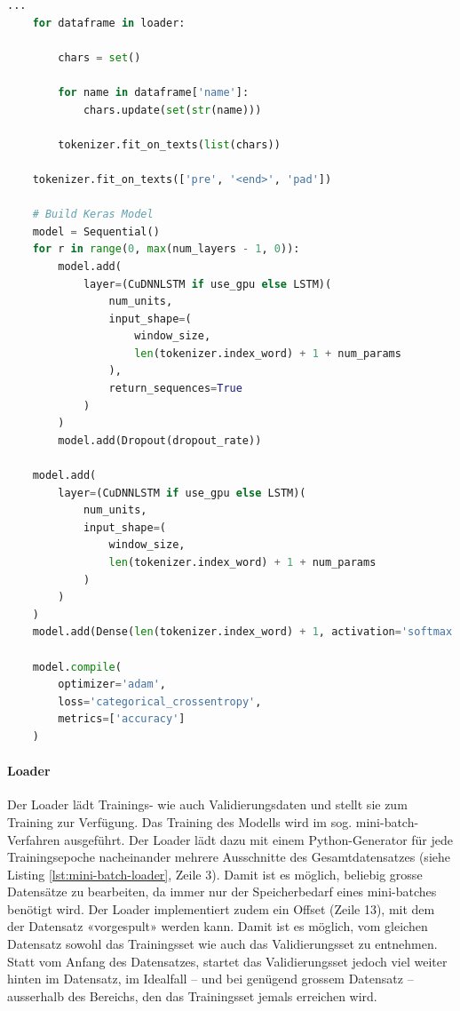 \begin{lstlisting}[basicstyle=\footnotesize, language=Python, caption=Der Builder erzeugt den Tokenizer sowie das Modell, label=lst:tokenizer]
    ...
    for dataframe in loader:

        chars = set()

        for name in dataframe['name']:
            chars.update(set(str(name)))

        tokenizer.fit_on_texts(list(chars))

    tokenizer.fit_on_texts(['pre', '<end>', 'pad'])

    # Build Keras Model
    model = Sequential()
    for r in range(0, max(num_layers - 1, 0)):
        model.add(
            layer=(CuDNNLSTM if use_gpu else LSTM)(
                num_units,
                input_shape=(
                    window_size,
                    len(tokenizer.index_word) + 1 + num_params
                ),
                return_sequences=True
            )
        )
        model.add(Dropout(dropout_rate))

    model.add(
        layer=(CuDNNLSTM if use_gpu else LSTM)(
            num_units,
            input_shape=(
                window_size,
                len(tokenizer.index_word) + 1 + num_params
            )
        )
    )
    model.add(Dense(len(tokenizer.index_word) + 1, activation='softmax'))

    model.compile(
        optimizer='adam',
        loss='categorical_crossentropy',
        metrics=['accuracy']
    )

\end{lstlisting}


\paragraph{Loader} Der Loader lädt Trainings- wie auch Validierungsdaten und stellt sie zum Training zur Verfügung.
Das Training des Modells wird im sog. \gls{mini-batch}-Verfahren ausgeführt.
Der Loader lädt dazu mit einem Python-Generator für jede Trainingsepoche nacheinander mehrere Ausschnitte des Gesamtdatensatzes (siehe Listing \ref{lst:mini-batch-loader}, Zeile 3).
Damit ist es möglich, beliebig grosse Datensätze zu bearbeiten, da immer nur der Speicherbedarf eines \gls{mini-batch}es benötigt wird.
Der Loader implementiert zudem ein Offset (Zeile 13), mit dem der Datensatz «vorgespult» werden kann.
Damit ist es möglich, vom gleichen Datensatz sowohl das Trainingsset wie auch das Validierungsset zu entnehmen.
Statt vom Anfang des Datensatzes, startet das Validierungsset jedoch viel weiter hinten im Datensatz, im Idealfall – und bei genügend grossem Datensatz – ausserhalb des Bereichs, den das Trainingsset jemals erreichen wird.

